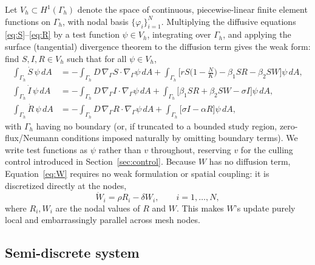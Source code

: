 \documentclass[11pt]{article}
\newcommand{\Grad}{\nabla_\Gamma}
\begin{document}
Let $V_h \subset H^1(\Gamma_h)$ denote the space of continuous, piecewise-linear finite element functions on $\Gamma_h$, with nodal basis $\{\varphi_i\}_{i=1}^N$. Multiplying the diffusive equations \eqref{eq:S}--\eqref{eq:R} by a test function $\psi \in V_h$, integrating over $\Gamma_h$, and applying the surface (tangential) divergence theorem to the diffusion term gives the weak form: find $S,I,R \in V_h$ such that for all $\psi \in V_h$,
\begin{align}
\int_{\Gamma_h} \dot S\, \psi\, dA &= -\int_{\Gamma_h} D\,\Grad S \cdot \Grad \psi \, dA + \int_{\Gamma_h}\Big[rS\big(1-\tfrac{N}{K}\big) - \beta_1 SR - \beta_2 SW\Big] \psi \, dA, \\
\int_{\Gamma_h} \dot I\, \psi\, dA &= -\int_{\Gamma_h} D\,\Grad I \cdot \Grad \psi \, dA + \int_{\Gamma_h}\big[\beta_1 SR + \beta_2 SW - \sigma I\big] \psi \, dA, \\
\int_{\Gamma_h} \dot R\, \psi\, dA &= -\int_{\Gamma_h} D\,\Grad R \cdot \Grad \psi \, dA + \int_{\Gamma_h}\big[\sigma I - \alpha R\big] \psi \, dA,
\end{align}
with $\Gamma_h$ having no boundary (or, if truncated to a bounded study region, zero-flux/Neumann conditions imposed naturally by omitting boundary terms). We write test functions as $\psi$ rather than $v$ throughout, reserving $v$ for the culling control introduced in Section~\ref{sec:control}. Because $W$ has no diffusion term, Equation~\eqref{eq:W} requires no weak formulation or spatial coupling: it is discretized directly at the nodes,
\begin{equation}
\dot W_i = \rho R_i - \delta W_i, \qquad i=1,\dots,N,
\end{equation}
where $R_i, W_i$ are the nodal values of $R$ and $W$. This makes $W$'s update purely local and embarrassingly parallel across mesh nodes.

\subsection{Semi-discrete system}
\end{document}
